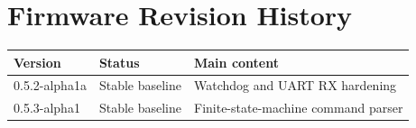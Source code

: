 \chapter{Firmware Revision History}

\begin{tabular}{lll}
\toprule
Version & Status & Main content \\
\midrule
0.5.2-alpha1a & Stable baseline & Watchdog and UART RX hardening \\
0.5.3-alpha1 & Stable baseline & Finite-state-machine command parser \\
\bottomrule
\end{tabular}
